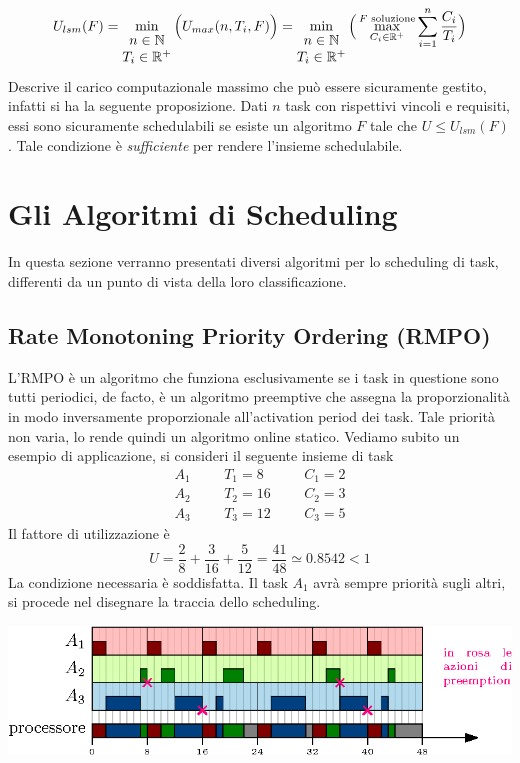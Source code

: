 \documentclass[10pt, letterpaper]{report}
\begin{document}
$$ U_{lsm}(F)=\min_{\begin{matrix}
n\in{\mathbb N} \\ T_i\in{\mathbb R}^+
\end{matrix}}\Big(U_{max}(n,T_i,F)\Big)= 
\min_{\begin{matrix}
    n\in{\mathbb N} \\ T_i\in{\mathbb R}^+
    \end{matrix}}\Big(
        \max_{C_i\in{\mathbb R}^+}^{F \text{ soluzione}}\sum_{i=1}^n\frac{C_i}{T_i}
    \Big)$$
Descrive il carico computazionale massimo che può essere sicuramente gestito, infatti si ha la seguente proposizione.\acc 
\prop{} Dati $n$ task con rispettivi vincoli e requisiti, essi sono sicuramente schedulabili 
se esiste un algoritmo $F$ tale che $U\le U_{lsm}(F)$. Tale condizione è \textit{sufficiente} per 
rendere l'insieme schedulabile.\flowerLine 
\section{Gli Algoritmi di Scheduling}
In questa sezione verranno presentati diversi algoritmi per lo scheduling di task, differenti da un 
punto di vista della loro classificazione.
\subsection{Rate Monotoning Priority Ordering (RMPO)}
L'RMPO è un algoritmo che funziona esclusivamente se i task in questione sono tutti periodici, 
de facto, è un algoritmo preemptive che assegna la proporzionalità in modo inversamente 
proporzionale all'activation period dei task. Tale priorità non varia, lo rende quindi un 
algoritmo online statico. Vediamo subito un esempio di applicazione, si consideri il seguente insieme 
di task
$$ 
\begin{matrix}
    A_1 & & & T_1=8 & & & C_1 =2\\ 
    A_2 & & & T_2=16 & & & C_2=3 \\ 
    A_3 & & &T_3=12 &&& C_3=5
\end{matrix}
$$
Il fattore di utilizzazione è $$ U=\frac{2}{8}+\frac{3}{16}+\frac{5}{12}=\frac{41}{48}\simeq 0.8542<1$$
La condizione necessaria è soddisfatta. Il task $A_1$ avrà sempre priorità sugli altri, si procede nel 
disegnare la traccia dello scheduling.\begin{center}
    \includegraphics[width=1.1\textwidth ]{images/esempioRMPO.eps}
\end{center}
\end{document}
